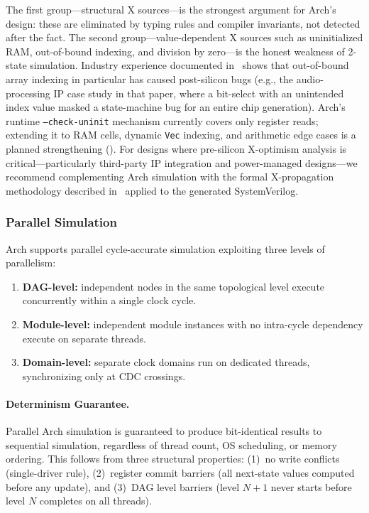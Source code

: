 \documentclass[11pt,twocolumn]{article}
\begin{document}
The first group---structural X sources---is the strongest argument for Arch's design: these are eliminated by typing rules and compiler invariants, not detected after the fact. The second group---value-dependent X sources such as uninitialized RAM, out-of-bound indexing, and division by zero---is the honest weakness of 2-state simulation. Industry experience documented in~\cite{zhao2014xoptimism} shows that out-of-bound array indexing in particular has caused post-silicon bugs (e.g., the audio-processing IP case study in that paper, where a bit-select with an unintended index value masked a state-machine bug for an entire chip generation). Arch's runtime \texttt{--check-uninit} mechanism currently covers only register reads; extending it to RAM cells, dynamic \texttt{Vec} indexing, and arithmetic edge cases is a planned strengthening (). For designs where pre-silicon X-optimism analysis is critical---particularly third-party IP integration and power-managed designs---we recommend complementing Arch simulation with the formal X-propagation methodology described in~\cite{zhao2014xoptimism} applied to the generated SystemVerilog.

\subsubsection{Parallel Simulation}

Arch supports parallel cycle-accurate simulation exploiting three levels of parallelism:

\begin{enumerate}
\item \textbf{DAG-level:} independent nodes in the same topological level execute concurrently within a single clock cycle.
\item \textbf{Module-level:} independent module instances with no intra-cycle dependency execute on separate threads.
\item \textbf{Domain-level:} separate clock domains run on dedicated threads, synchronizing only at CDC crossings.
\end{enumerate}

\paragraph{Determinism Guarantee.}
Parallel Arch simulation is guaranteed to produce bit-identical results to sequential simulation, regardless of thread count, OS scheduling, or memory ordering. This follows from three structural properties:
(1)~no write conflicts (single-driver rule),
(2)~register commit barriers (all next-state values computed before any update), and
(3)~DAG level barriers (level $N{+}1$ never starts before level $N$ completes on all threads).
\end{document}

